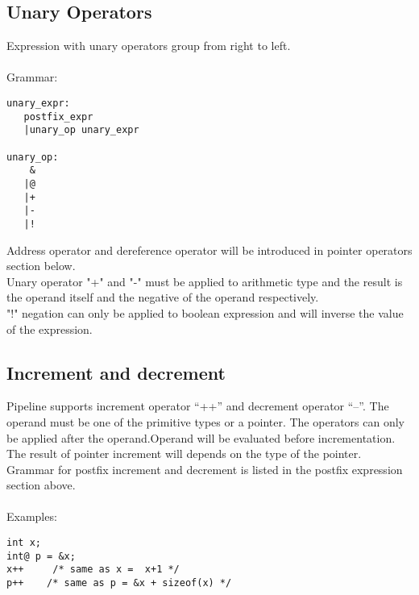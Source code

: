 \documentclass[./LRM_main.tex]{subfiles}
\begin{document}
\subsection{Unary Operators}
Expression with unary operators group from right to left.\\
\vspace{1 mm}\\
Grammar:
\begin{lstlisting}
unary_expr:
   postfix_expr
   |unary_op unary_expr

unary_op:
    &
   |@
   |+
   |-
   |!
\end{lstlisting}
Address operator and dereference operator will be introduced in pointer operators section below.\\
Unary operator "+" and "-" must be applied to arithmetic type and the result is the operand itself and the negative of the operand respectively.\\
"!" negation can only be applied to boolean expression and will inverse the value of the expression.\\ 
\subsection{Increment and decrement}
Pipeline supports increment operator “++” and  decrement operator “--”. The operand must be one of the primitive types or a pointer. The operators can only be applied after the operand.Operand will be evaluated before incrementation.\\
The result of pointer increment will depends on the type of the pointer.\\
Grammar for postfix increment and decrement is listed in the postfix expression section above.\\
\vspace{1 mm}\\
Examples:
\begin{lstlisting}
int x;
int@ p = &x;
x++     /* same as x =  x+1 */
p++    /* same as p = &x + sizeof(x) */ 
\end{lstlisting}
\end{document}
